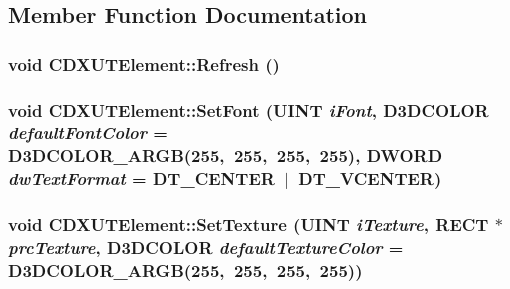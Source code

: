 \subsection{Member Function Documentation}
\hypertarget{class_c_d_x_u_t_element_a835872a666a7a38f13a02a74090d5003}{
\subsubsection[{Refresh}]{\setlength{\rightskip}{0pt plus 5cm}void CDXUTElement::Refresh ()}}
\label{class_c_d_x_u_t_element_a835872a666a7a38f13a02a74090d5003}
\hypertarget{class_c_d_x_u_t_element_a34b6abc34f58b0378e2b1030c0f1f674}{
\subsubsection[{SetFont}]{\setlength{\rightskip}{0pt plus 5cm}void CDXUTElement::SetFont (UINT {\em iFont}, \/  D3DCOLOR {\em defaultFontColor} = {\ttfamily D3DCOLOR\_\-ARGB(255,~255,~255,~255)}, \/  DWORD {\em dwTextFormat} = {\ttfamily DT\_\-CENTER~$|$~DT\_\-VCENTER})}}
\label{class_c_d_x_u_t_element_a34b6abc34f58b0378e2b1030c0f1f674}
\hypertarget{class_c_d_x_u_t_element_ac12fafe3f0d7f946298f4cd7b7a85800}{
\subsubsection[{SetTexture}]{\setlength{\rightskip}{0pt plus 5cm}void CDXUTElement::SetTexture (UINT {\em iTexture}, \/  RECT $\ast$ {\em prcTexture}, \/  D3DCOLOR {\em defaultTextureColor} = {\ttfamily D3DCOLOR\_\-ARGB(255,~255,~255,~255)})}}
\label{class_c_d_x_u_t_element_ac12fafe3f0d7f946298f4cd7b7a85800}


